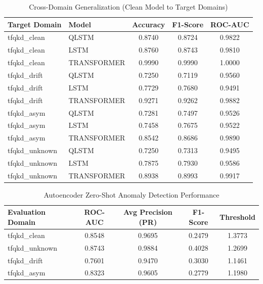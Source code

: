 \begin{table}[htbp]
\centering
\caption{Cross-Domain Generalization (Clean Model to Target Domains)}
\label{tab:cross_domain}
\begin{tabular}{@{}llccc@{}}
\toprule
\textbf{Target Domain} & \textbf{Model} & \textbf{Accuracy} & \textbf{F1-Score} & \textbf{ROC-AUC} \\ \midrule
tfqkd\_clean & QLSTM & 0.8740 & 0.8724 & 0.9822 \\
tfqkd\_clean & LSTM & 0.8760 & 0.8743 & 0.9810 \\
tfqkd\_clean & TRANSFORMER & 0.9990 & 0.9990 & 1.0000 \\
tfqkd\_drift & QLSTM & 0.7250 & 0.7119 & 0.9560 \\
tfqkd\_drift & LSTM & 0.7729 & 0.7680 & 0.9491 \\
tfqkd\_drift & TRANSFORMER & 0.9271 & 0.9262 & 0.9882 \\
tfqkd\_asym & QLSTM & 0.7281 & 0.7497 & 0.9526 \\
tfqkd\_asym & LSTM & 0.7458 & 0.7675 & 0.9522 \\
tfqkd\_asym & TRANSFORMER & 0.8542 & 0.8686 & 0.9890 \\
tfqkd\_unknown & QLSTM & 0.7250 & 0.7313 & 0.9495 \\
tfqkd\_unknown & LSTM & 0.7875 & 0.7930 & 0.9586 \\
tfqkd\_unknown & TRANSFORMER & 0.8938 & 0.8993 & 0.9917 \\
\bottomrule
\end{tabular}
\end{table}
\begin{table}[htbp]
\centering
\caption{Autoencoder Zero-Shot Anomaly Detection Performance}
\label{tab:anomaly_metrics}
\begin{tabular}{@{}lcccc@{}}
\toprule
\textbf{Evaluation Domain} & \textbf{ROC-AUC} & \textbf{Avg Precision (PR)} & \textbf{F1-Score} & \textbf{Threshold} \\ \midrule
tfqkd\_clean & 0.8548 & 0.9695 & 0.2479 & 1.3773 \\
tfqkd\_unknown & 0.8743 & 0.9884 & 0.4028 & 1.2699 \\
tfqkd\_drift & 0.7601 & 0.9470 & 0.3030 & 1.1461 \\
tfqkd\_asym & 0.8323 & 0.9605 & 0.2779 & 1.1980 \\
\bottomrule
\end{tabular}
\end{table}
